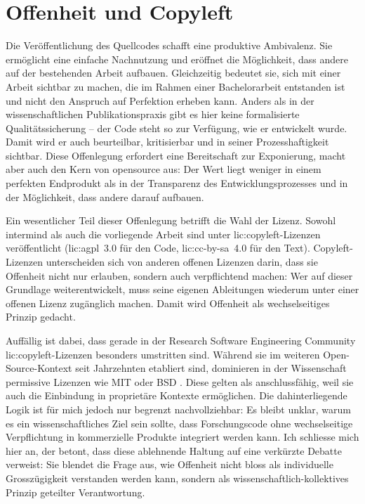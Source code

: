 \section{Offenheit und Copyleft}

Die Veröffentlichung des Quellcodes schafft eine produktive Ambivalenz. Sie ermöglicht eine einfache Nachnutzung und eröffnet die Möglichkeit, dass andere auf der bestehenden Arbeit aufbauen. Gleichzeitig bedeutet sie, sich mit einer Arbeit sichtbar zu machen, die im Rahmen einer Bachelorarbeit entstanden ist und nicht den Anspruch auf Perfektion erheben kann. Anders als in der wissenschaftlichen Publikationspraxis gibt es hier keine formalisierte Qualitätssicherung -- der Code steht so zur Verfügung, wie er entwickelt wurde. Damit wird er auch beurteilbar, kritisierbar und in seiner Prozesshaftigkeit sichtbar. Diese Offenlegung erfordert eine Bereitschaft zur Exponierung, macht aber auch den Kern von \gls{opensource} aus: Der Wert liegt weniger in einem perfekten Endprodukt als in der Transparenz des Entwicklungsprozesses und in der Möglichkeit, dass andere darauf aufbauen.

Ein wesentlicher Teil dieser Offenlegung betrifft die Wahl der Lizenz. Sowohl \gls{intermind} als auch die vorliegende Arbeit sind unter \gls{lic:copyleft}-Lizenzen veröffentlicht (\gls{lic:agpl}~3.0 für den Code, \gls{lic:cc-by-sa}~4.0 für den Text). Copyleft-Lizenzen unterscheiden sich von anderen offenen Lizenzen darin, dass sie Offenheit nicht nur erlauben, sondern auch verpflichtend machen: Wer auf dieser Grundlage weiterentwickelt, muss seine eigenen Ableitungen wiederum unter einer offenen Lizenz zugänglich machen. Damit wird Offenheit als wechselseitiges Prinzip gedacht.

Auffällig ist dabei, dass gerade in der Research Software Engineering Community \gls{lic:copyleft}-Lizenzen besonders umstritten sind. Während sie im weiteren Open-Source-Kontext seit Jahrzehnten etabliert sind, dominieren in der Wissenschaft permissive Lizenzen wie MIT oder BSD \parencite{sethiWhyEarthAre2020}. Diese gelten als anschlussfähig, weil sie auch die Einbindung in proprietäre Kontexte ermöglichen. Die dahinterliegende Logik ist für mich jedoch nur begrenzt nachvollziehbar: Es bleibt unklar, warum es ein wissenschaftliches Ziel sein sollte, dass Forschungscode ohne wechselseitige Verpflichtung in kommerzielle Produkte integriert werden kann. Ich schliesse mich hier \textcite{sethiWhyEarthAre2020} an, der betont, dass diese ablehnende Haltung auf eine verkürzte Debatte verweist: Sie blendet die Frage aus, wie Offenheit nicht bloss als individuelle Grosszügigkeit verstanden werden kann, sondern als wissenschaftlich-kollektives Prinzip geteilter Verantwortung.

